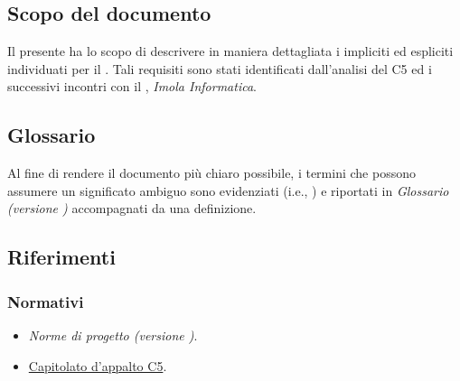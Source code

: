 \documentclass[../analisi-dei-requisiti.tex]{subfiles}
\begin{document}
\subsection{Scopo del documento}%
\label{sub:scopo_del_documento}
Il presente  ha lo scopo di descrivere in maniera dettagliata i  impliciti ed espliciti individuati per il .
Tali requisiti sono stati identificati dall'analisi del  C5 ed i successivi incontri con il , \textit{Imola Informatica}.

\scopoDelProdotto{}

\subsection{Glossario}%
\label{sub:glossario}
Al fine di rendere il documento più chiaro possibile, i termini che possono assumere un significato ambiguo sono evidenziati (i.e., ) e riportati in \textit{Glossario (versione \versione)} accompagnati da una definizione.

\subsection{Riferimenti}%
\label{sub:riferimenti}
\subsubsection{Normativi}%
\label{par:normativi}
\begin{itemize}
  \item \textit{Norme di progetto (versione \versione)}.
  \item \href{https://www.math.unipd.it/~tullio/IS-1/2019/Progetto/C5.pdf}{Capitolato d'appalto C5}.
\end{itemize}
\end{document}
